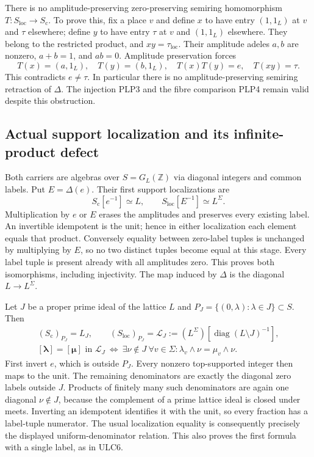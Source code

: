 There is no amplitude-preserving zero-preserving semiring
homomorphism $T:S_{\mathrm{loc}}\to S_{\mathrm c}$. To prove this,
fix a place $v$ and define $x$ to have entry $(1,1_L)$ at $v$ and
$\tau$ elsewhere; define $y$ to have entry $\tau$ at $v$ and
$(1,1_L)$ elsewhere. They belong to the restricted product, and
$xy=\tau_{\mathrm{loc}}$. Their amplitude adeles $a,b$ are nonzero,
$a+b=1$, and $ab=0$. Amplitude preservation forces
\begin{equation}\tag{PLP5}
T(x)=(a,1_L),\quad T(y)=(b,1_L),\quad
T(x)T(y)=e,\quad T(xy)=\tau.
\end{equation}
This contradicts $e\ne\tau$. In particular there is no
amplitude-preserving semiring retraction of $\Delta$. The injection
PLP3 and the fibre comparison PLP4 remain valid despite this obstruction.

\subsection{Actual support localization and its infinite-product defect}

Both carriers are algebras over $S=G_L(\mathbb Z)$ via diagonal
integers and common labels. Put $E=\Delta(e)$. Their first support
localizations are
\begin{equation}\tag{PLP6}
S_{\mathrm c}[e^{-1}]\simeq L,\qquad
S_{\mathrm{loc}}[E^{-1}]\simeq L^\Sigma.
\end{equation}
Multiplication by $e$ or $E$ erases the amplitudes and preserves
every existing label. An invertible idempotent is the unit; hence in
either localization each element equals that product. Conversely
equality between zero-label tuples is unchanged by multiplying by
$E$, so no two distinct tuples become equal at this stage.
Every label tuple is present already with all amplitudes zero. This
proves both isomorphisms, including injectivity. The map induced by
$\Delta$ is the diagonal $L\to L^\Sigma$.

Let $J$ be a proper prime ideal of the lattice $L$ and
$P_J=\{(0,\lambda):\lambda\in J\}\subset S$. Then
\begin{equation}\tag{PLP7}
\begin{gathered}
(S_{\mathrm c})_{P_J}=L_J,\qquad
(S_{\mathrm{loc}})_{P_J}=
\mathscr L_J:=
(L^\Sigma)[\operatorname{diag}(L\setminus J)^{-1}],\\
[\boldsymbol\lambda]=[\boldsymbol\mu]\text{ in }\mathscr L_J
\ \Longleftrightarrow\
\exists\nu\notin J\ \forall v\in\Sigma:
\lambda_v\wedge\nu=\mu_v\wedge\nu .
\end{gathered}
\end{equation}
First invert $e$, which is outside $P_J$. Every nonzero top-supported
integer then maps to the unit. The remaining denominators are exactly
the diagonal zero labels outside $J$. Products of finitely many such
denominators are again one diagonal $\nu\notin J$, because the
complement of a prime lattice ideal is closed under meets. Inverting
an idempotent identifies it with the unit, so every fraction has a
label-tuple numerator. The usual localization equality is consequently
precisely the displayed uniform-denominator relation. This also proves
the first formula with a single label, as in ULC6.


